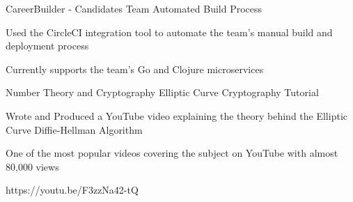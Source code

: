 \begin{cventries}
  \cventry
   	{CareerBuilder - Candidates Team} %
    {Automated Build Process} %
    {} %
    {} %
    {
      \begin{cvitems} %
        \item {Used the CircleCI integration tool to automate the team's manual build and deployment process}
        \item {Currently supports the team's Go and Clojure microservices}
    	\end{cvitems}
	}
    
    \cventry
    {Number Theory and Cryptography} %
    {Elliptic Curve Cryptography Tutorial} %
    {} %
    {} %
    {
      \begin{cvitems} %
        \item {Wrote and Produced a YouTube video explaining the theory behind the Elliptic Curve Diffie-Hellman Algorithm}
        \item {One of the most popular videos covering the subject on YouTube with almost 80,000 views}
        \item{https://youtu.be/F3zzNa42-tQ}
      \end{cvitems}
    }

\end{cventries}
